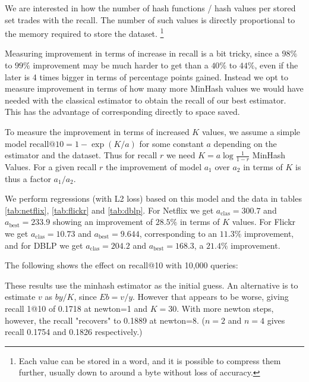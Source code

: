 We are interested in how the number of hash functions / hash values per stored set trades with the recall.
The number of such values is directly proportional to the memory required to store the dataset.
\footnote{Each value can be stored in a word, and it is possible to compress them further, usually down to around a byte without loss of accuracy.}

Measuring improvement in terms of increase in recall is a bit tricky, since a $98\%$ to $99\%$ improvement may be much harder to get than a $40\%$ to $44\%$, even if the later is 4 times bigger in terms of percentage points gained.
Instead we opt to measure improvement in terms of how many more MinHash values we would have needed with the classical estimator to obtain the recall of our best estimator.
This has the advantage of corresponding directly to space saved.

To measure the improvement in terms of increased $K$ values,
we assume a simple model $\text{recall@10} = 1 - \exp(K/a)$ for some constant $a$ depending on the estimator and the dataset.
Thus for recall $r$ we need $K=a\log\frac1{1-r}$ MinHash Values.
For a given recall $r$ the improvement of model $a_1$ over $a_2$ in terms of $K$ is thus a factor $a_1/a_2$.

We perform regressions (with L2 loss) based on this model and the data in tables \ref{tab:netflix}, \ref{tab:flickr} and \ref{tab:dblp}.
For Netflix we get $a_\text{clas}=300.7$ and $a_\text{best} = 233.9$ showing an improvement of $28.5\%$ in terms of $K$ values.
For Flickr we get $a_\text{clas}=10.73$ and $a_\text{best} = 9.644$, corresponding to an $11.3\%$ improvement,
and for DBLP we get $a_\text{clas}=204.2$ and $a_\text{best}=168.3$, a $21.4\%$ improvement.


The following shows the effect on recall@10 with 10,000 queries:

These results use the minhash estimator as the initial guess.
An alternative is to estimate $v$ as $by/K$, since $Eb=v/y$.
However that appears to be worse, giving recall 1@10 of 0.1718 at newton=1 and $K=30$.
With more newton steps, however, the recall "recovers" to 0.1889 at newton=8.
($n=2$ and $n=4$ gives recall 0.1754 and 0.1826 respectively.)

